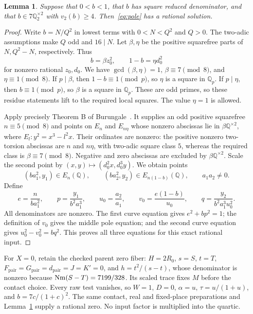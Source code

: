 \documentclass[11pt,a4paper]{article}
\newtheorem{lemma}[theorem]{Lemma}
\newcommand{\Q}{\mathbb Q}\newcommand{\Z}{\mathbb Z}
\begin{document}
\begin{lemma}\label{lem:pole-completeness}
Suppose that $0<b<1$, that $b$ has square reduced denominator, and that
$b\in7\Q_2^{\times2}$ with $v_2(b)\ge4$. Then~\eqref{eq:pole} has a
rational solution.
\end{lemma}
\begin{proof}
Write $b=N/Q^2$ in lowest terms with $0<N<Q^2$ and $Q>0$.
The two-adic assumptions make $Q$ odd and $16\mid N$.
Let $\beta,\eta$ be the positive squarefree parts of $N,Q^2-N$,
respectively. Thus
\[
 b=\beta z_0^2,\qquad 1-b=\eta d_0^2
\]
for nonzero rational $z_0,d_0$. We have $\gcd(\beta,\eta)=1$,
$\beta\equiv7\pmod8$, and $\eta\equiv1\pmod8$.
If $p\mid\beta$, then $1-b\equiv1\pmod p$, so $\eta$ is a square
in $\Q_p$. If $p\mid\eta$, then $b\equiv1\pmod p$, so $\beta$
is a square in $\Q_p$. These are odd primes, so these residue statements
lift to the required local squares. The value $\eta=1$ is allowed.

Apply precisely Theorem B of Burungale~\cite{Burungale}. It supplies
an odd positive squarefree $n\equiv5\pmod8$ and points on
$E_n$ and $E_{n\eta}$ whose nonzero abscissas lie in
$\beta\Q^{\times2}$, where $E_l:y^2=x^3-l^2x$.
Their ordinates are nonzero: the positive nonzero two-torsion abscissas
are $n$ and $n\eta$, with two-adic square class $5$, whereas the
required class is $\beta\equiv7\pmod8$. Negative and zero
abscissas are excluded by $\beta\Q^{\times2}$.
Scale the second point by $(x,y)\mapsto(d_0^2x,d_0^3y)$.
We obtain points
\[
 (ba_1^2,y_1)\in E_n(\Q),\qquad
 (ba_2^2,y_2)\in E_{n(1-b)}(\Q),\qquad a_1a_2\ne0.
\]
Define
\[
 e=\frac{n}{ba_1^2},\qquad p=\frac{y_1}{b^2a_1^3},\qquad
 u_0=\frac{a_2}{a_1},\qquad
 v_0=\frac{e(1-b)}{u_0},\qquad
 q=\frac{y_2}{b^2a_1^3u_0^2}.
\]
All denominators are nonzero. The first curve equation gives
$e^2+bp^2=1$; the definition of $v_0$ gives the middle pole equation;
and the second curve equation gives $u_0^2-v_0^2=bq^2$.
This proves all three equations for this exact rational input.
\end{proof}

For $X=0$, retain the checked parent zero fiber: $H=2R_0$,
$s=S$, $t=T$, $F_{\mathrm{pair}}=G_{\mathrm{pair}}=d_{
\mathrm{pair}}=J=K'=0$, and
$h=t^2/(s-t)$, whose denominator is nonzero because
$\operatorname{Nm}(S-T)=7199/328$. Its scaled trace fixes $M$ before the contact
choice. Every raw test vanishes, so $W=1$, $D=0$, $\alpha=u$,
$\tau=u/(1+u)$, and $b=7c/(1+c)^2$. The same contact, real and
fixed-place preparations and Lemma~\ref{lem:pole-completeness} supply
a rational zero. No input factor is
multiplied into the quartic.
\end{document}
